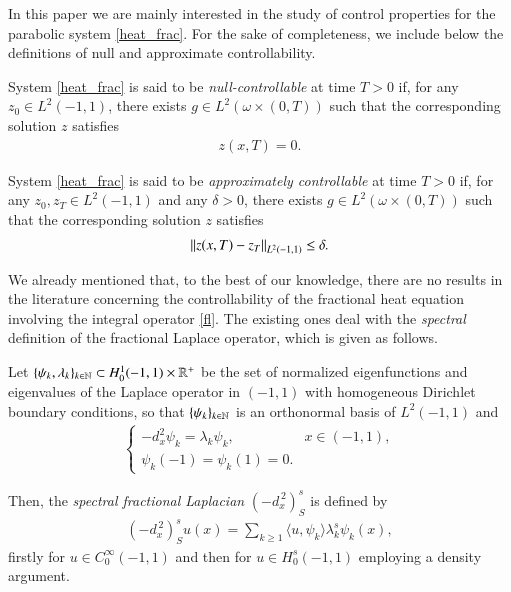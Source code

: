 In this paper we are mainly interested in the study of control properties for the parabolic system \eqref{heat_frac}. For the sake of completeness, we include below the definitions of null and approximate controllability.

\begin{definition}
	System \eqref{heat_frac} is said to be \textit{null-controllable} at time $T>0$ if, for any $z_0\in L^2(-1,1)$, there exists $g\in L^2(\omega\times(0,T))$ such that the corresponding solution $z$ satisfies 
	\begin{align*}
		z(x,T)=0.
	\end{align*}
\end{definition}

\begin{definition}
	System \eqref{heat_frac} is said to be \textit{approximately controllable} at time $T>0$ if, for any $z_0,z_T\in L^2(-1,1)$ and any $\delta>0$, there exists $g\in L^2(\omega\times(0,T))$ such that the corresponding solution $z$ satisfies 
	\begin{align*}
		{\left\|z(x,T)-z_T\right\|}_{L^2(-1,1)}\leq\delta.
	\end{align*}
\end{definition}

We already mentioned that, to the best of our knowledge, there are no results in the literature concerning the controllability of the fractional heat equation involving the integral operator \eqref{fl}. The existing ones deal with the \textit{spectral} definition of the fractional Laplace operator, which is given as follows.

Let $\{\psi_k,\lambda_k\}_{k\in\mathbb{N}}\subset H_0^1(-1,1)\times\mathbb{R}^+$ be the set of normalized eigenfunctions and eigenvalues of the Laplace operator in $(-1,1)$ with homogeneous Dirichlet boundary conditions, so that $\{\psi_k\}_{k\in\mathbb{N}}$ is an orthonormal basis of $L^2(-1,1)$ and         
\begin{align*}
	\begin{cases}
		-d_x^2\psi_k =\lambda_k\psi_k, & x\in (-1,1), 
		\\
		\psi_k(-1)=\psi_k(1)=0.
	\end{cases}
\end{align*}

Then, the \textit{spectral fractional Laplacian} $(-d_x^{\,2})^s_S$ is defined by
\begin{align}\label{fl_spec}
	(-d_x^{\,2})^s_S u(x) = \sum_{k\geq 1}\langle u,\psi_k\rangle \lambda_k^s\psi_k(x),
\end{align}
firstly for $u\in C_0^{\infty}(-1,1)$ and then for $u\in H_0^s(-1,1)$ employing a density argument.

